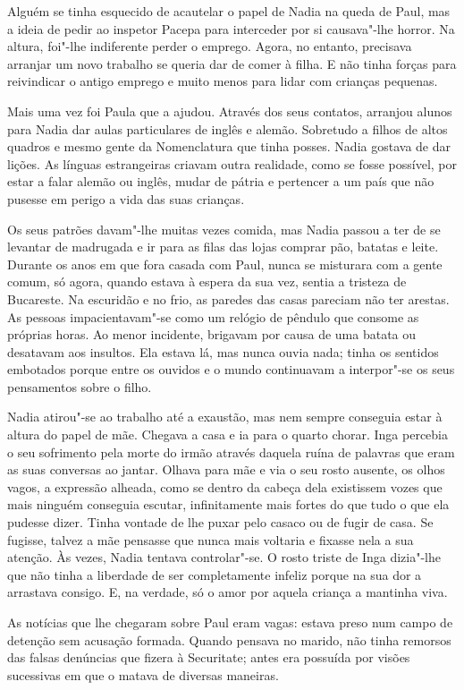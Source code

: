 Alguém se tinha esquecido de acautelar o papel de Nadia na queda de
Paul, mas a ideia de pedir ao inspetor Pacepa para interceder por si
causava"-lhe horror. Na altura, foi"-lhe indiferente perder o emprego.
Agora, no entanto, precisava arranjar um novo trabalho se queria dar
de comer à filha. E não tinha forças para reivindicar o antigo emprego e
muito menos para lidar com crianças pequenas.

Mais uma vez foi Paula que a ajudou. Através dos seus contatos,
arranjou alunos para Nadia dar aulas particulares de inglês e alemão.
Sobretudo a filhos de altos quadros e mesmo gente da Nomenclatura que
tinha posses. Nadia gostava de dar lições. As línguas estrangeiras criavam outra realidade, como se fosse possível, por estar a falar alemão ou
inglês, mudar de pátria e pertencer a um país que não pusesse em perigo
a vida das suas crianças.

Os seus patrões davam"-lhe muitas vezes comida,
mas Nadia passou a ter de se levantar de madrugada e ir para as filas
das lojas comprar pão, batatas e leite. Durante os anos em que fora
casada com Paul, nunca se misturara com a gente comum, só agora, quando
estava à espera da
sua vez, sentia a tristeza de Bucareste. Na escuridão e no frio, as
paredes das casas pareciam não ter arestas. As pessoas
impacientavam"-se como um relógio de pêndulo que consome as próprias
horas. Ao menor incidente, brigavam por causa de uma batata ou desatavam
aos insultos. Ela estava lá, mas nunca ouvia nada; tinha os sentidos
embotados porque entre os ouvidos e o mundo continuavam a interpor"-se
os seus pensamentos sobre o filho.

Nadia atirou"-se ao trabalho até a exaustão, mas nem sempre conseguia
estar à altura do papel de mãe. Chegava a casa e ia para o quarto
chorar. Inga percebia o seu sofrimento pela morte do irmão através
daquela ruína de palavras que eram as suas conversas ao jantar. Olhava
para mãe e via o seu rosto ausente, os olhos vagos, a expressão alheada,
como se dentro da cabeça dela existissem vozes que mais ninguém
conseguia escutar, infinitamente mais fortes do que tudo o que ela
pudesse dizer. Tinha vontade de lhe puxar pelo casaco ou de fugir de
casa. Se fugisse, talvez a mãe pensasse que nunca mais voltaria e
fixasse nela a sua atenção. Às vezes, Nadia tentava controlar"-se. O
rosto triste de Inga dizia"-lhe que não tinha a liberdade de ser
completamente infeliz porque na sua dor a arrastava consigo. E, na
verdade, só o amor por aquela criança a mantinha viva.

As notícias que lhe chegaram sobre Paul eram vagas:
estava preso num campo de detenção sem acusação formada. Quando
pensava no marido, não tinha remorsos das falsas denúncias que fizera à
Securitate; antes era possuída por visões sucessivas em que o matava de
diversas maneiras.

